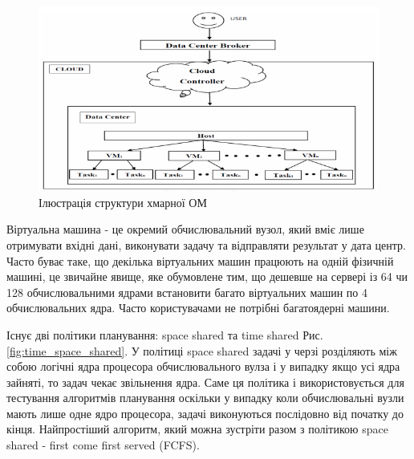 \begin{figure}[H]
	\centering
	\includegraphics[width=\textwidth]{task_analysis/img/cloud_representation}
	\caption{Ілюстрація структури хмарної ОМ}
	\label{fig:cloud_representation}
\end{figure}

Віртуальна машина - це окремий обчислювальний вузол, який вміє лише отримувати вхідні дані, виконувати задачу та відправляти результат у дата центр. Часто буває таке, що декілька віртуальних машин працюють на одній фізичній машині, це звичайне явище, яке обумовлене тим, що дешевше на сервері із 64 чи 128 обчислювальними ядрами встановити багато віртуальних машин по 4 обчислювальних ядра. Часто користувачами не потрібні багатоядерні машини.

Існує дві політики планування: space shared та time shared Рис. \ref{fig:time_space_shared}. У політиці space shared задачі у черзі розділяють між собою логічні ядра процесора обчислювального вулза і у випадку якщо усі ядра зайняті, то задач чекає звільнення ядра. Саме ця політика і використовується для тестування алгоритмів планування оскільки у випадку коли обчислювальні вузли мають лише одне ядро процесора, задачі виконуються послідовно від початку до кінця. Найпростіший алгоритм, який можна зустріти разом з політикою space shared - first come first served (FCFS).

